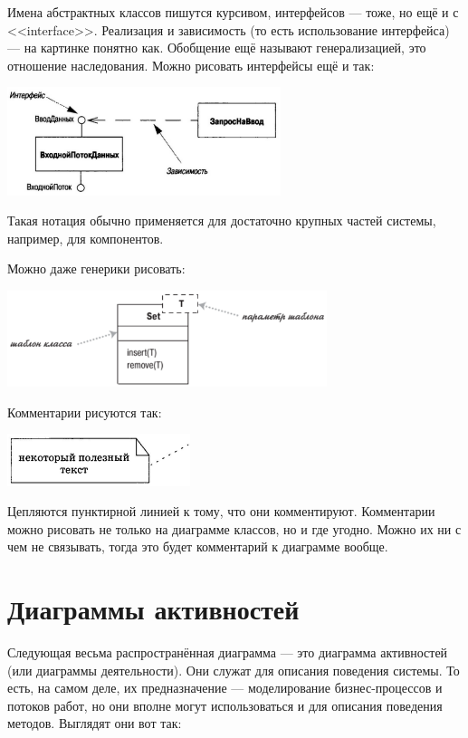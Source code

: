 \documentclass[a5paper]{article}
\begin{document}
Имена абстрактных классов пишутся курсивом, интерфейсов --- тоже, но ещё и с <<interface>>. Реализация и зависимость (то есть использование интерфейса) --- на картинке понятно как. Обобщение ещё называют генерализацией, это отношение наследования. Можно рисовать интерфейсы ещё и так:

\begin{center}
	\includegraphics[width=0.6\textwidth]{interfaces2.png}
\end{center}

Такая нотация обычно применяется для достаточно крупных частей системы, например, для компонентов.

Можно даже генерики рисовать:

\begin{center}
	\includegraphics[width=0.7\textwidth]{templates.png}
\end{center}

Комментарии рисуются так:

\begin{center}
	\includegraphics[width=0.4\textwidth]{comment.png}
\end{center}

Цепляются пунктирной линией к тому, что они комментируют. Комментарии можно рисовать не только на диаграмме классов, но и где угодно. Можно их ни с чем не связывать, тогда это будет комментарий к диаграмме вообще.

\section{Диаграммы активностей}

Следующая весьма распространённая диаграмма --- это диаграмма активностей (или диаграммы деятельности). Они служат для описания поведения системы. То есть, на самом деле, их предназначение --- моделирование бизнес-процессов и потоков работ, но они вполне могут использоваться и для описания поведения методов. Выглядят они вот так:
\end{document}
